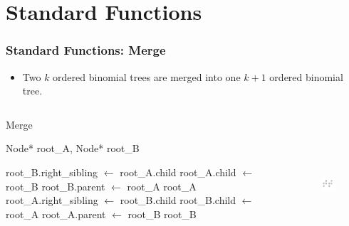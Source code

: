 \documentclass[13pt]{beamer}
\begin{document}
\section{Standard Functions} %
\begin{frame}
\frametitle{Standard Functions: Merge}
  \begin{itemize}
    \item Two $k$ ordered binomial trees are merged into one $k + 1$ ordered binomial tree.
  \end{itemize}

  \begin{columns}[T] %
    \begin{column}[T]{6cm} %
        \begin{algorithm}[H]
        \small
        \caption{Merge}
        \begin{algorithmic}
          \REQUIRE Node* root\_A, Node* root\_B

            \STATE root\_B.right\_sibling $\leftarrow$ root\_A.child
            \STATE root\_A.child $\leftarrow$ root\_B
            \STATE root\_B.parent $\leftarrow$ root\_A
            \RETURN root\_A
          \ELSE
            \STATE root\_A.right\_sibling $\leftarrow$ root\_B.child
            \STATE root\_B.child $\leftarrow$ root\_A
            \STATE root\_A.parent $\leftarrow$ root\_B
            \RETURN root\_B
          \ENDIF
        \end{algorithmic}
        \end{algorithm}
    \end{column}
    \begin{column}[T]{5.5cm} %
      \begin{figure}
        \includegraphics[height=5cm]{./img/premerge.png}
      \end{figure}
    \end{column}
  \end{columns}

\end{frame}
\end{document}
